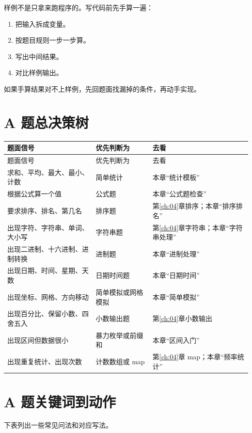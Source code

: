 样例不是只拿来跑程序的。写代码前先手算一遍：

\begin{enumerate}
  \item 把输入拆成变量。
  \item 按题目规则一步一步算。
  \item 写出中间结果。
  \item 对比样例输出。
\end{enumerate}

如果手算结果对不上样例，先回题面找漏掉的条件，再动手实现。

\section{A 题总决策树}\label{sec:05-4}

\begin{longtable}{p{4cm}p{5cm}p{5cm}}
\toprule
题面信号 & 优先判断为 & 去看 \\
\midrule
\endfirsthead
\toprule
题面信号 & 优先判断为 & 去看 \\
\midrule
\endhead
求和、平均、最大、最小、计数 & 简单统计 & 本章“统计模板” \\
根据公式算一个值 & 公式题 & 本章“公式题检查” \\
要求排序、排名、第几名 & 排序题 & 第\ref{ch:04}章排序；本章“排序排名” \\
出现字符、字符串、单词、大小写 & 字符串题 & 第\ref{ch:04}章字符串；本章“字符串处理” \\
出现二进制、十六进制、进制转换 & 进制题 & 本章“进制处理” \\
出现日期、时间、星期、天数 & 日期时间题 & 本章“日期时间” \\
出现坐标、网格、方向移动 & 简单模拟或网格模拟 & 本章“简单模拟” \\
出现百分比、保留小数、四舍五入 & 小数输出题 & 第\ref{ch:04}章小数输出 \\
出现区间但数据很小 & 暴力枚举或前缀和 & 本章“区间入门” \\
出现重复统计、出现次数 & 计数数组或 map & 第\ref{ch:04}章 map；本章“频率统计” \\
\bottomrule
\end{longtable}

\section{A 题关键词到动作}\label{sec:05-5}

下表列出一些常见问法和对应写法。

